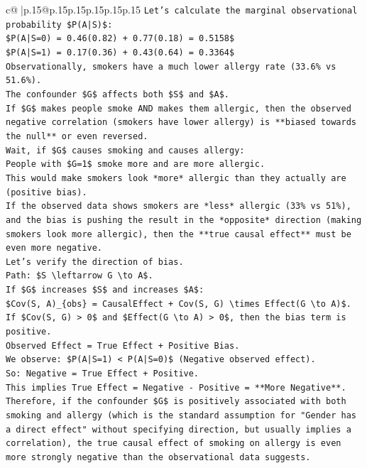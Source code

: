\documentclass{article}
\begin{document}
{\begin{supertabular}{c@{$\;$}|p{.15\linewidth}@{}p{.15\linewidth}p{.15\linewidth}p{.15\linewidth}p{.15\linewidth}p{.15\linewidth}}
{{{\texttt{Let's calculate the marginal observational probability \$P(A|S)\$:} \\
\texttt{\$P(A|S=0) = 0.46(0.82) + 0.77(0.18) = 0.5158\$} \\
\texttt{\$P(A|S=1) = 0.17(0.36) + 0.43(0.64) = 0.3364\$} \\
\texttt{Observationally, smokers have a much lower allergy rate (33.6\% vs 51.6\%).} \\
\texttt{The confounder \$G\$ affects both \$S\$ and \$A\$.} \\
\texttt{If \$G\$ makes people smoke AND makes them allergic, then the observed negative correlation (smokers have lower allergy) is **biased towards the null** or even reversed.} \\
\texttt{Wait, if \$G\$ causes smoking and causes allergy:} \\
\texttt{People with \$G=1\$ smoke more and are more allergic.} \\
\texttt{This would make smokers look *more* allergic than they actually are (positive bias).} \\
\texttt{If the observed data shows smokers are *less* allergic (33\% vs 51\%), and the bias is pushing the result in the *opposite* direction (making smokers look more allergic), then the **true causal effect** must be even more negative.} \\
\texttt{Let's verify the direction of bias.} \\
\texttt{Path: \$S \textbackslash{}leftarrow G \textbackslash{}to A\$.} \\
\texttt{If \$G\$ increases \$S\$ and increases \$A\$:} \\
\texttt{\$Cov(S, A)\_\{obs\} = CausalEffect + Cov(S, G) \textbackslash{}times Effect(G \textbackslash{}to A)\$.} \\
\texttt{If \$Cov(S, G) > 0\$ and \$Effect(G \textbackslash{}to A) > 0\$, then the bias term is positive.} \\
\texttt{Observed Effect = True Effect + Positive Bias.} \\
\texttt{We observe: \$P(A|S=1) < P(A|S=0)\$ (Negative observed effect).} \\
\texttt{So: Negative = True Effect + Positive.} \\
\texttt{This implies True Effect = Negative {-} Positive = **More Negative**.} \\
\texttt{Therefore, if the confounder \$G\$ is positively associated with both smoking and allergy (which is the standard assumption for "Gender has a direct effect" without specifying direction, but usually implies a correlation), the true causal effect of smoking on allergy is even more strongly negative than the observational data suggests.} \\
}}}
\end{supertabular}}
\end{document}
